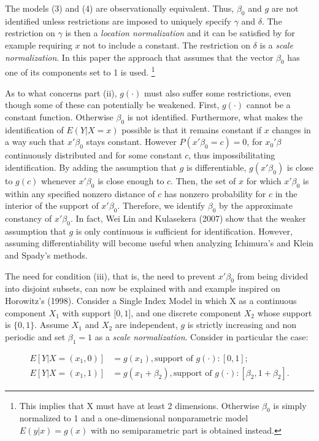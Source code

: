 \documentclass[a4paper]{article}
\begin{document}
The models (3) and (4) are observationally equivalent. Thus, $\beta_0$ and $g$ are not identified unless restrictions are imposed to uniquely specify $\gamma$ and $\delta$. The restriction on $\gamma$ is then a \textit{location normalization} and it can be satisfied by for example requiring $x$ not to include a constant. The restriction on $\delta$ is a \textit{scale normalization}. In this paper the approach that assumes that the vector $\beta_0$ has one of its components set to 1 is used. \footnote{This implies that X must have at least 2 dimensions. Otherwise $\beta_0$ is simply normalized to 1 and a one-dimensional nonparametric model $E(y|x) = g(x)$ with no semiparametric part is obtained instead.}

As to what concerns part (ii), $g(\cdot)$ must also suffer some restrictions, even though some of these can potentially be weakened. First, $g(\cdot)$ cannot be a constant function. Otherwise $\beta_0$ is not identified. Furthermore, what makes the identification of $E(Y|X = x)$ possible is that it remains constant if $x$ changes in a way such that $x'\beta_0$ stays constant. However $P(x'\beta_0 = c)=0$, for $x_0'\beta$ continuously distributed and for some constant $c$, thus impossibilitating identification. By adding the assumption that $g$ is differentiable, $g(x'\beta_0)$ is close to $g(c)$ whenever $x'\beta_0$ is close enough to $c$. Then, the set of $x$ for which $x'\beta_0$ is within any specified nonzero distance of $c$ has nonzero probability for $c$ in the interior of the support of $x'\beta_0$. Therefore, we identify $\beta_0$ by the approximate constancy of $x'\beta_0$. In fact, Wei Lin and Kulasekera (2007) show that the weaker assumption that $g$ is only continuous is sufficient for identification. However, assuming differentiability will become useful when analyzing Ichimura's and Klein and Spady's methods.

The need for condition (iii), that is,  the need to prevent $x'\beta_0$  from being divided into disjoint subsets, can now be explained with and example inspired on Horowitz's (1998). Consider a Single Index Model in which X as a continuous component $X_1$ with support $\big[0,1\big]$, and one discrete component $X_2$ whose support is $\{0,1\}$. Assume $X_1$ and $X_2$ are independent, $g$ is strictly increasing and non periodic and set $\beta_1 = 1$ as a \textit{scale normalization}. Consider in particular the case:

\[
\begin{split}
E[Y| X = (x_1,0)]& = g(x_1), \text{support\ of } g(\cdot): [0,1];  \\
E[Y| X = (x_1,1)]& = g(x_1+\beta_2), \text{support\ of } g(\cdot): [\beta_2,1+\beta_2].
\end{split}
\]
\end{document}
